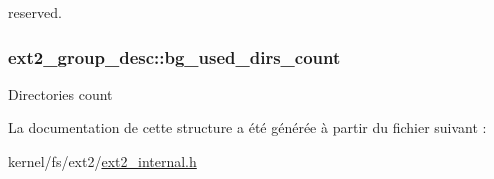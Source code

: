 reserved. \hypertarget{structext2__group__desc_adc9924671cb04dd63b4b7ffff8c262dc}{
\subsubsection[{bg\-\_\-used\-\_\-dirs\-\_\-count}]{ ext2\-\_\-group\-\_\-desc\-::bg\-\_\-used\-\_\-dirs\-\_\-count}}\label{structext2__group__desc_adc9924671cb04dd63b4b7ffff8c262dc}
Directories count 

La documentation de cette structure a été générée à partir du fichier suivant \-:\begin{DoxyCompactItemize}
\item 
kernel/fs/ext2/\hyperlink{ext2__internal_8h}{ext2\-\_\-internal.\-h}\end{DoxyCompactItemize}
